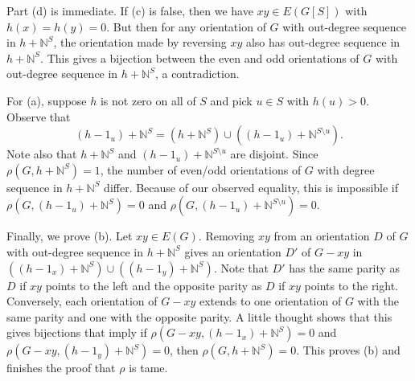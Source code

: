 \documentclass[12pt]{article}
\theoremstyle{plain}
\theoremstyle{definition}
\theoremstyle{remark}
\newcommand{\IN}{\mathbb{N}}
\begin{document}
Part (d) is immediate.  If (c) is false, then we have $xy \in E(G[S])$ with $h(x) = h(y) = 0$.  But then for any orientation of $G$ with out-degree sequence in $h + \IN^S$, the orientation made by reversing $xy$ also has out-degree sequence in $h + \IN^S$.  This gives a bijection between the even and odd orientations of $G$ with out-degree sequence in $h + \IN^S$, a contradiction.

For (a), suppose $h$ is not zero on all of $S$ and pick $u \in S$ with $h(u) > 0$.  Observe that 
\[(h - 1_u) + \IN^S = (h + \IN^S) \cup ((h - 1_u) + \IN^{S \setminus u}).\]
Note also that $h + \IN^S$ and $(h - 1_u) + \IN^{S \setminus u}$ are disjoint.  Since $\rho(G, h + \IN^S) = 1$, the number of even/odd orientations of $G$ with degree sequence in $h + \IN^S$ differ.  Because of our observed equality, this is impossible if $\rho(G, (h - 1_u) + \IN^S) = 0$ and $\rho(G, (h - 1_u) + \IN^{S \setminus u}) = 0$. 

Finally, we prove (b).  Let $xy \in E(G)$.  Removing $xy$ from an orientation $D$ of $G$ with out-degree sequence in $h + \IN^S$ gives an orientation $D'$ of $G-xy$ in $((h - 1_x) + \IN^S) \cup ((h - 1_y) + \IN^S)$.  Note that $D'$ has the same parity as $D$ if $xy$ points to the left and the opposite parity as $D$ if $xy$ points to the right.  Conversely, each orientation of $G-xy$ extends to one orientation of $G$ with the same parity and one with the opposite parity.  A little thought shows that this gives bijections that imply if $\rho(G-xy, (h - 1_x) + \IN^S) = 0$ and $\rho(G-xy, (h - 1_y) + \IN^S) = 0$, then $\rho(G, h + \IN^S) = 0$.  This proves (b) and finishes the proof that $\rho$ is tame.


\end{document}
